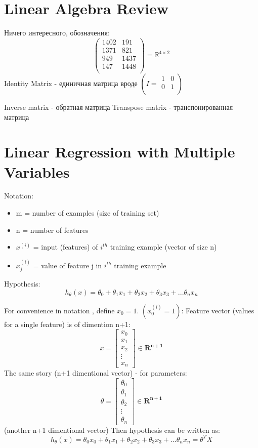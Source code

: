 \documentclass{scrartcl}
\begin{document}
\section {Linear Algebra Review}
Ничего интересного, обозначения:
\[
\left( \begin{array}{cc}
    1402 & 191 \\
    1371 & 821 \\ 949 & 1437 \\ 147 & 1448 \\
  \end{array} \right) = \mathbb{R}^{4\times2}
\]
Identity Matrix - единичная матрица вроде $\left( I
  = \begin{array}{cc}
    1 & 0 \\ 0 & 1 \\
  \end{array}
\right)$


Inverse matrix - обратная матрица Transpose matrix - транспонированная
матрица

\label{Chapter 4}
\section {Linear Regression with Multiple Variables}

Notation:
\begin{itemize}
\item {m} = number of examples (size of training set)
\item {n} = number of features
\item{$x^{(i)}$} = input (features) of $i^{th}$ training example
  (vector of size n)
\item {$x_j^{(i)}$} = value of feature j in $i^{th}$ training example
\end{itemize}

Hypothesis:
\[ h_\theta(x) = \theta_0 + \theta_1x_1 + \theta_2x_2 + \theta_3x_3 +
... \theta_nx_n \]

For convenience in notation , define $x_0=1$. $(x_0^{(i)}=1)$: Feature
vector (values for a single feature) is of dimention n+1:
\[ x = \left[ \begin{array}{c} x_0 \\ x_1 \\ x_2 \\ \vdots \\ x_n
  \end{array} \right] \in \mathbf{R^{n+1}} \]
The same story (n+1 dimentional vector) - for parameters:
\[
\theta = \left[ \begin{array}{c} \theta_0 \\ \theta_1 \\ \theta_2 \\
    \vdots \\ \theta_n
  \end{array} \right] \in \mathbf{R^{n+1}}
\]
(another n+1 dimentional vector) Then hypothesis can be written as:
\[
h_\theta(x) = \theta_0x_0 + \theta_1x_1 + \theta_2x_2 + \theta_3x_3 +
... \theta_nx_n = \theta^TX \]
\end{document}
